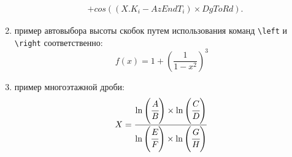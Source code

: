\begin{enumerate}
{\begin{equation}
\begin{split}
	    &+cos((X.K_i - AzEndT_i)\times DgToRd).
	\label{eq:ф14}
	\end{split}
	\end{equation}
}
\item пример автовыбора высоты скобок путем использования команд \verb=\left= и \verb=\right= соответственно:
{\zerodisplayskips
	\begin{equation}
	f(x)=1+\left(\frac{1}{1-x^{2}}
	\right)^3
	\end{equation}
}
\item пример многоэтажной дроби:
{\zerodisplayskips
	\begin{equation}
	X=\frac{\ln\left(\cfrac{A}{B}\right)\times \ln\left(\cfrac{C}{D}\right)}{\ln\left(\cfrac{E}{F} \right)\times \ln\left(\cfrac{G}{H} \right)}
	\end{equation}
}
\end{enumerate}	


